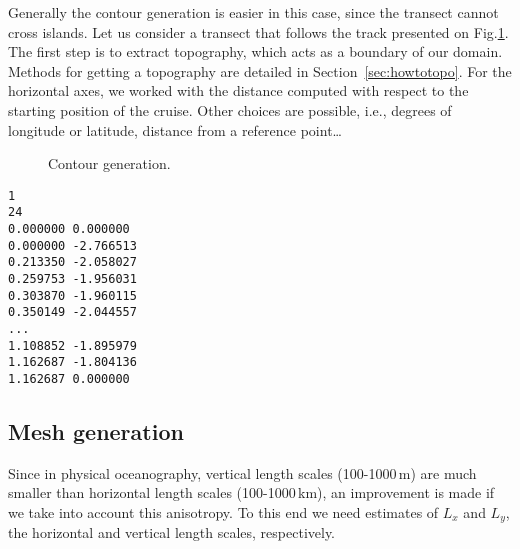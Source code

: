 Generally the contour generation is easier in this case, since the transect cannot cross islands. Let us consider a transect that follows the track presented on Fig.\ref{fig:data}. The first step is to extract topography, which acts as a boundary of our domain. Methods for getting a topography are detailed in Section~\ref{sec:howtotopo}. For the horizontal axes, we worked with the distance computed with respect to the starting position of the cruise. Other choices are possible, i.e., degrees of longitude or latitude, distance from a reference point\ldots

\begin{figure}[htpb]
\centering
{}
\caption{Contour generation.\label{fig:data}}
\end{figure}


\begin{exfile}
\begin{footnotesize}
\begin{verbatim}
1 
24 
0.000000 0.000000 
0.000000 -2.766513 
0.213350 -2.058027 
0.259753 -1.956031 
0.303870 -1.960115 
0.350149 -2.044557 
...
1.108852 -1.895979 
1.162687 -1.804136 
1.162687 0.000000 

\end{verbatim}
\end{footnotesize}
\caption{Contour file of Fig. \ref{fig:data}(b).\label{exfile:contour}}
\end{exfile}


\subsection{Mesh generation\label{sec:meshscale}}



Since in physical oceanography, vertical length scales (100-1000\,m) are much smaller than horizontal length scales (100-1000\,km), an improvement is  made if we take into account this anisotropy. To this end we need estimates of $L_{x}$ and $L_{y}$, the horizontal and vertical length scales, respectively.


